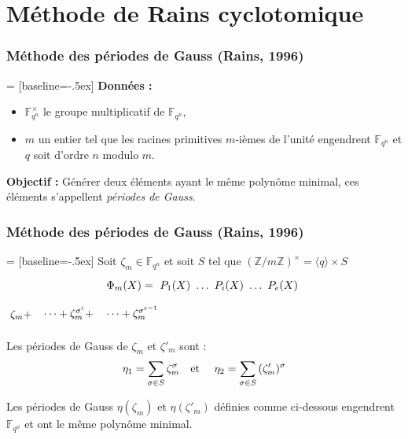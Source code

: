 \documentclass{beamer} %
\numberwithin{equation}{section}
\newcommand\zmodninv[1]{(\mathbb{Z}/#1\mathbb{Z})^{\times}}
\newcommand\GF[1]{\mathbb{F}_{#1}}
\newcommand\etmath{\textup{\quad et \quad}}
\newcommand\groupgen[1]{\langle{#1}\rangle}
\begin{document}
\section{Méthode de Rains cyclotomique}
\begin{frame}
\frametitle{Méthode des périodes de Gauss (Rains, 1996)}
 = [baseline=-.5ex]
\textbf{Données :}
\begin{itemize}
	\item $\GF{q^n}^{\times}$ le groupe multiplicatif de $\GF{q^n}$,
	\item $m$ un entier tel que les racines primitives $m$-ièmes de l'unité
engendrent $\GF{q^n}$ et $q$ soit d'ordre $n$ modulo $m$.
\end{itemize}
\vspace{0.3cm}
\textbf{Objectif :}
Générer deux éléments ayant le même polynôme minimal, ces éléments s'appellent
\emph{périodes de Gauss}.
\end{frame}
\begin{frame}
\frametitle{Méthode des périodes de Gauss (Rains, 1996)}
 = [baseline=-.5ex]
Soit $\zeta_m\in \GF{q^n}$  et soit $S$ tel que $\zmodninv{m} = 
\groupgen{q}\times S$
\begin{equation*}
\Phi_m(X) = \tikz[baseline]{\node[anchor=base] (t1) {$P_1(X)$};} \dots 
\tikz[baseline]{\node[anchor=base] (t2) {$P_i(X)$};}
\dots 
\tikz[baseline]{\node[anchor=base] (t3) {$P_e(X)$};}
\end{equation*}
\hspace{4cm}
$\tikz\node [] (n1) {$\zeta_m + $};$
$\tikz\node [] (n2) {$\dots + \zeta_m^{\sigma^i} + $};$
$\tikz\node [] (n3) {$\dots + \zeta_m^{\sigma^{e-1}}$};$

Les périodes de Gauss de $\zeta_m$ et $\zeta'_m$ sont :
\[
\eta_1 = \sum_{\sigma\in S}{\zeta_m^{\sigma}}\etmath
\eta_2 = \sum_{\sigma\in S}{(\zeta'_m)^{\sigma}}
\]
\begin{framed}
\begin{thm}
Les périodes de Gauss $\eta(\zeta_m)$ et $\eta(\zeta'_m)$ définies comme 
ci-dessous engendrent $\GF{q^n}$ et ont le même polynôme minimal.
\end{thm}
\end{framed}
\end{frame}
\end{document}
